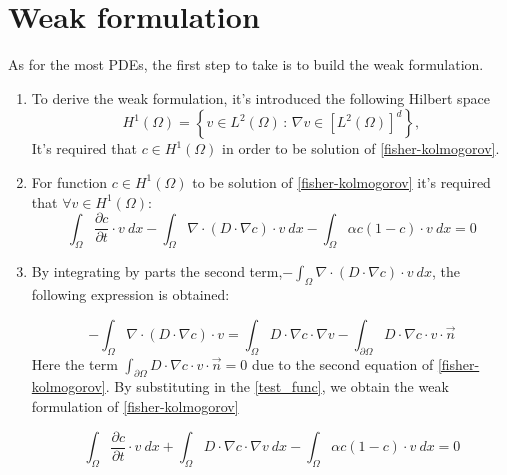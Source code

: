 \documentclass[12pt, a4paper, twoside, openright]{report}
\begin{document}
\section{Weak formulation}
As for the most PDEs, the first step to take is to build the weak formulation.
\begin{enumerate}
  \item To derive the weak formulation, it's introduced the following Hilbert space \[
    H^1(\Omega) = \left\{ v \in L^2(\Omega) \, : \, \nabla v \in \left[L^2(\Omega)\right]^d \right\},
    \]
    It's required that $c \in H^1(\Omega)$ in order to be solution of \autoref{fisher-kolmogorov}.

  \item For function $c \in H^1(\Omega) $ to be solution of \autoref{fisher-kolmogorov} it's required that $\forall v \in H^1(\Omega)$:
  \begin{equation}
       \label{test_func}
        \int_{\Omega} {\frac{\partial c}{\partial t} \cdot v \ dx} - \int_{\Omega}{\nabla \cdot (D \cdot \nabla c) \cdot v \ dx} - \int_{\Omega} {\alpha c(1-c) \cdot v} \ dx = 0 
  \end{equation}
  
  \item By integrating by parts the second term,$- \int_{\Omega}{\nabla \cdot (D \cdot \nabla c) \cdot v \ dx}$, the following expression is obtained:

  \begin{equation}
  \label{integrate_by_parts}
      - \int_{\Omega}{\nabla \cdot (D \cdot \nabla c) \cdot v}=\int_{\Omega}{D \cdot \nabla c \cdot \nabla v}-\int_{\partial \Omega}{D \cdot \nabla c \cdot v \cdot \vec{n}}
  \end{equation}
  Here the term $\int_{\partial \Omega}{D \cdot \nabla c \cdot v \cdot \vec{n}}=0$ due to the second equation of \autoref{fisher-kolmogorov}. By substituting in the \autoref{test_func}, we obtain the weak formulation of \autoref{fisher-kolmogorov}

  \begin{equation}
    \label{weak_formulation}
    \int_{\Omega} {\frac{\partial c}{\partial t} \cdot v \ dx} + \int_{\Omega}{D \cdot \nabla c \cdot \nabla v \ dx} - \int_{\Omega} {\alpha c(1-c) \cdot v}\  dx = 0    
  \end{equation}
\end{enumerate}
\end{document}
